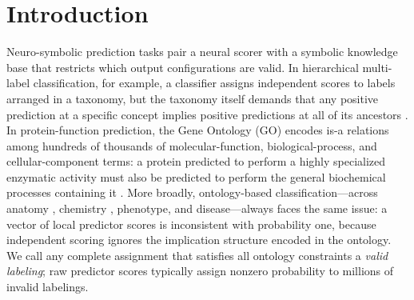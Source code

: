 \begin{abstract}
We prove that exact separators preserve the monolithic WMC posterior
(Proposition~\ref{prop:exact-modular}) and that module marginal error
is bounded by boundary posterior error under TV distance
(Proposition~\ref{prop:boundary-error}). Experiments on five complete
biomedical ontologies---Gene Ontology cellular component, molecular
function, and biological process; UBERON anatomy; and ChEBI chemistry,
comprising up to 205,592 terms---show exact marginal recovery on
instances where monolithic references are available, completion of
all-term inference beyond the 300\,GB memory limit of monolithic
junction-tree inference, and systematic reduction in recovered-marginal
error as separator rank increases. On the CAFA Critical Assessment of
Function Annotation benchmark, ontology-conditioned posterior correction
eliminates true-path violations and improves calibration over raw
predictor scores.
\end{abstract}


\section{Introduction}
\label{sec:intro}

Neuro-symbolic prediction tasks pair a neural scorer with a symbolic
knowledge base that restricts which output configurations are valid.
In hierarchical multi-label classification, for example, a classifier
assigns independent scores to labels arranged in a taxonomy, but the
taxonomy itself demands that any positive prediction at a specific
concept implies positive predictions at all of its ancestors
\citep{silla2011survey}. In protein-function prediction, the Gene
Ontology (GO) encodes is-a relations among hundreds of thousands of
molecular-function, biological-process, and cellular-component terms:
a protein predicted to perform a highly specialized enzymatic activity
must also be predicted to perform the general biochemical processes
containing it \citep{ashburner2000go,geneontology2023}. More broadly,
ontology-based classification---across anatomy \citep{mungall2012uberon},
chemistry \citep{hastings2016chebi}, phenotype, and disease---always faces
the same issue: a vector of local predictor scores is inconsistent with
probability one, because independent scoring ignores the implication
structure encoded in the ontology. We call any complete assignment that
satisfies all ontology constraints a \emph{valid labeling}; raw
predictor scores typically assign nonzero probability to millions of
invalid labelings.

